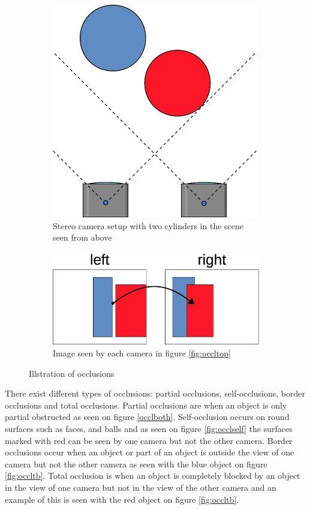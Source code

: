 \begin{figure}[ht]
  \centering
  \begin{subfigure}[t]{0.45\textwidth}
    \centering\includegraphics[scale=0.4]{figures/occltop.jpg}
    \caption{Stereo camera setup with two cylinders in the scene seen from above\label{fig:occltop}}
  \end{subfigure}\hspace{0.5cm}
  \begin{subfigure}[t]{0.45\textwidth}
    \centering\includegraphics[scale=0.4]{figures/occl2view}
    \caption{Image seen by each camera in figure \vref{fig:occltop}\label{fig:occl2view}}
  \end{subfigure}
  \caption{Illstration of occlusions\label{fig:occlboth}}
\end{figure}

There exist different types of occlusions: partial occlusions, self-occlusions, border occlusions and total occlusions. Partial occlusions are when an object is only partial obstructed as seen on figure \vref{occlboth}. Self-occlusion occurs on round surfaces such as faces, and balls and as seen on figure \vref{fig:occlself} the surfaces marked with red can be seen by one camera but not the other camera. Border occlusions occur when an object or part of an object is outside the view of one camera but not the other camera as seen with the blue object on figure \ref{fig:occltb}. Total occlusion is when an object is completely blocked by an object in the view of one camera but not in the view of the other camera and an example of this is seen with the red object on figure \vref{fig:occltb}.\\

